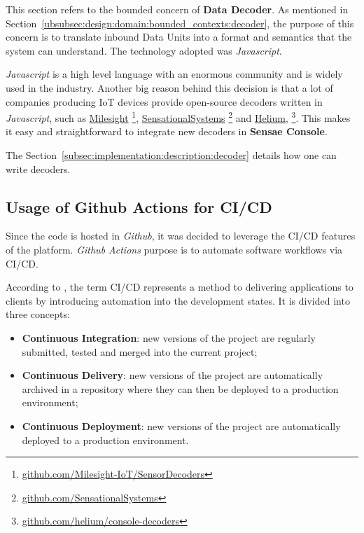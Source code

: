 This section refers to the bounded concern of \textbf{Data Decoder}. As mentioned in Section~\ref{ubsubsec:design:domain:bounded_contexts:decoder}, the purpose of this concern is to translate inbound Data Units into a format and semantics that the system can understand. The technology adopted was \textit{Javascript}.

\textit{Javascript} is a high level language with an enormous community and is widely used in the industry. Another big reason behind this decision is that a lot of companies producing \gls{IoT} devices provide open-source decoders written in \textit{Javascript}, such as \href{https://github.com/Milesight-IoT/SensorDecoders}{Milesight} \footnote{\href {https://github.com/Milesight-IoT/SensorDecoders}{github.com/Milesight-IoT/SensorDecoders}}, \href{https://github.com/SensationalSystems}{SensationalSystems} \footnote{\href {https://github.com/SensationalSystems}{github.com/SensationalSystems}} and \href{https://github.com/helium/console-decoders}{Helium}, \footnote{\href {https://github.com/helium/console-decoders}{github.com/helium/console-decoders}}. This makes it easy and straightforward to integrate new decoders in \textbf{Sensae Console}.

The Section~\ref{subsec:implementation:description:decoder} details how one can write decoders.

\subsection{Usage of Github Actions for CI/CD}
\label{subsec:implementation:decisions:actions}

Since the code is hosted in \textit{Github}, it was decided to leverage the CI/CD features of the platform. \textit{Github Actions} purpose is to automate software workflows via CI/CD.

According to \cite{cicd}, the term CI/CD represents a method to delivering applications to clients by introducing automation into the development states.
It is divided into three concepts:

\begin{itemize}
    \item \textbf{Continuous Integration}: new versions of the project are regularly submitted, tested and merged into the current project;
    \item \textbf{Continuous Delivery}: new versions of the project are automatically archived in a repository where they can then be deployed to a production environment;
    \item \textbf{Continuous Deployment}: new versions of the project are automatically deployed to a production environment.
\end{itemize}

